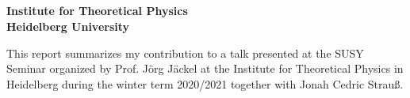 \begin{center}

	\makeatletter
	\thispagestyle{plain}
	\LARGE\textbf{\@title} \\
	\vspace{2mm}
	\Large\textbf{\@subtitle} \\
	\vspace{2mm}
	\large\bfseries{\@author} \\
	\normalfont
	\vspace{2mm}
	\large{\@date} \\
	\vspace{2mm}
	\large{Institute for Theoretical Physics \\
		Heidelberg University} \\
	\makeatother
\end{center}

\normalsize
\noindent This report summarizes my contribution to a talk presented at the SUSY Seminar organized by Prof. J\"org J\"ackel at the Institute for Theoretical Physics in Heidelberg during the winter term 2020/2021 together with Jonah Cedric Strau\ss. \\

\noindent\blindtext